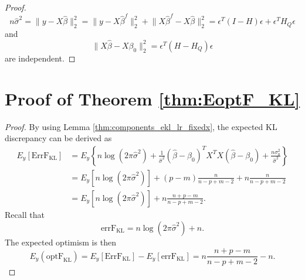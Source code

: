 \begin{proof}
\begin{equation*}
n\hat{\sigma}^2 = \lVert y-X\hat{\beta} \rVert_2^2 = \lVert y-X\hat{\beta}^f \rVert_2^2 + \lVert X\hat{\beta}^f - X\hat{\beta} \rVert_2^2 = \epsilon^T (I-H) \epsilon + \epsilon^T H_Q \epsilon
\end{equation*}
and
\begin{equation*}
\lVert X\hat{\beta} - X\beta_0 \rVert_2^2 = \epsilon^T (H-H_Q) \epsilon
\end{equation*}
are independent.
\end{proof}


\section{Proof of Theorem \ref{thm:EoptF_KL}}
\begin{proof}
By using Lemma \ref{thm:components_ekl_lr_fixedx}, the expected KL discrepancy can be derived as
\begin{equation*}
\begin{aligned}
E_y [\text{ErrF}_\text{KL} ] 
&= E_y \left\{ n \log (2\pi \hat\sigma^2) + \frac{1}{\hat\sigma^2}  (\hat\beta-\beta_0)^T X^T X (\hat\beta-\beta_0) + \frac{n\sigma_0^2}{\hat\sigma^2} \right\} \\
&= E_y \left [ n\log (2\pi \hat \sigma^2)\right ] +  (p-m) \frac{n}{n-p+m-2} + n \frac{n}{n-p+m-2}\\
&= E_y \left [ n\log (2\pi \hat \sigma^2) \right ] +  n \frac{n+p-m}{n-p+m-2}.
\end{aligned}
\end{equation*}
Recall that
\begin{equation*}
\text{errF}_\text{KL} = n\log(2\pi \hat\sigma^2) + n.
\end{equation*}
The expected optimism is then
\begin{equation*}
E_y(\text{optF}_\text{KL}) = E_y[\text{ErrF}_\text{KL} ]  -  E_y[\text{errF}_\text{KL} ] = n \frac{n+p-m}{n-p+m-2} - n.
\end{equation*}
\end{proof}


